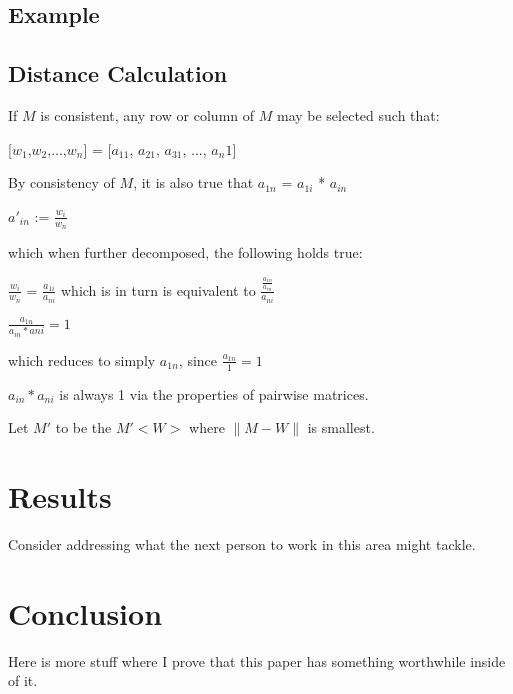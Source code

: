 \documentclass[12pt]{amsart}
\newtheorem{theorem}{Theorem}
\theoremstyle{definition}
\begin{document}
\subsection{Example}

\subsection{Distance Calculation}
%
%    
%

If $M$ is consistent, any row or column of $M$ may be selected such that:

[$w_1$,$w_2$,...,$w_n$] = [$a_{11}$, $a_{21}$, $a_{31}$, ..., $a_n1$]

By consistency of $M$, it is also true that 
$a_{1n}$ = $a_{1i}$ * $a_{in}$

$a'_{in}$ := $\frac{w_i}{w_n}$

which when further decomposed, the following holds true:

$\frac{w_i}{w_n}$ = $\frac{a_{1i}}{a_{ni}}$ which is in turn is equivalent to $\frac{\frac{a_{1n}}{a_{in}}}{a_{ni}}$

$\frac{a_{1n}}{a_{in}*a{ni}} = 1$

which reduces to simply $a_{1n}$, since $\frac{a_{1n}}{1} = 1$

${a_{in}*a_{ni}}$ is always 1 via the properties of pairwise matrices.

Let $M'$ to be the $M'<W>$ where $\|M-W\|$ is smallest.






\section{Results}

Consider addressing what the next person to work in this area might tackle.

\section{Conclusion}

Here is more stuff where I prove that this paper has something worthwhile inside of it.



\end{document}
